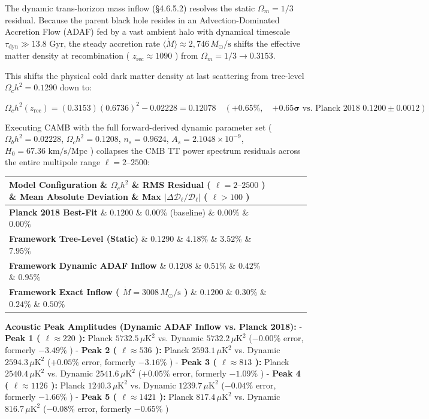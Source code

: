 \documentclass[11pt,a4paper]{article}
\theoremstyle{definition}\newtheorem{definition}{Definition}
\theoremstyle{remark}\newtheorem{remark}{Remark}
\begin{document}
The dynamic trans-horizon mass inflow (§4.6.5.2) resolves the static $\Omega_m = 1/3$ residual. Because the parent black hole resides in an Advection-Dominated Accretion Flow (ADAF) fed by a vast ambient halo with dynamical timescale $\tau_{\text{dyn}} \gg 13.8\text{ Gyr}$, the steady accretion rate $\langle\dot{M}\rangle \approx 2{,}746\,M_\odot/\text{s}$ shifts the effective matter density at recombination ( $z_{\text{rec}} \approx 1090$ ) from $\Omega_m = 1/3 \to 0.3153$.

This shifts the physical cold dark matter density at last scattering from tree-level $\Omega_c h^2 = 0.1290$ down to:


\begin{equation}
\Omega_c h^2(z_{\text{rec}}) = (0.3153)(0.6736)^2 - 0.02228 = 0.12078 \quad (\mathbf{+0.65\%}, \quad \mathbf{+0.65\sigma} \text{ vs. Planck 2018 } 0.1200 \pm 0.0012)
\end{equation}


Executing CAMB with the full forward-derived dynamic parameter set ( $\Omega_b h^2 = 0.02228$, $\Omega_c h^2 = 0.1208$, $n_s = 0.9624$, $A_s = 2.1048 \times 10^{-9}$, $H_0 = 67.36\text{ km/s/Mpc}$ ) collapses the CMB TT power spectrum residuals across the entire multipole range $\ell = 2\text{--}2500$:

\begin{longtable}{lllll}
\hline
Model Configuration \& $\Omega_c h^2$ \& RMS Residual ( $\ell = 2\text{--}2500$ ) \& Mean Absolute Deviation \& Max $|\Delta \mathcal{D}_\ell/\mathcal{D}_\ell|$ ( $\ell > 100$ ) \\
\hline
\textbf{Planck 2018 Best-Fit} \& $0.1200$ \& $0.00\%$ (baseline) \& $0.00\%$ \& $0.00\%$ \\
\textbf{Framework Tree-Level (Static)} \& $0.1290$ \& \textbf{$4.18\%$} \& $3.52\%$ \& $7.95\%$ \\
\textbf{Framework Dynamic ADAF Inflow} \& $0.1208$ \& \textbf{$0.51\%$} \& \textbf{$0.42\%$} \& \textbf{$0.95\%$} \\
\textbf{Framework Exact Inflow ( $\dot{M} = 3008\,M_\odot/\text{s}$ )} \& $0.1200$ \& \textbf{$0.30\%$} \& \textbf{$0.24\%$} \& \textbf{$0.50\%$} \\
\hline
\end{longtable}
\textbf{Acoustic Peak Amplitudes (Dynamic ADAF Inflow vs. Planck 2018):}
- \textbf{Peak 1 ( $\ell \approx 220$ ):} Planck $5732.5\,\mu\text{K}^2$ vs. Dynamic \textbf{$5732.2\,\mu\text{K}^2$} (\textbf{$-0.00\%$} error, formerly $-3.49\%$ )
- \textbf{Peak 2 ( $\ell \approx 536$ ):} Planck $2593.1\,\mu\text{K}^2$ vs. Dynamic \textbf{$2594.3\,\mu\text{K}^2$} (\textbf{$+0.05\%$} error, formerly $-3.16\%$ )
- \textbf{Peak 3 ( $\ell \approx 813$ ):} Planck $2540.4\,\mu\text{K}^2$ vs. Dynamic \textbf{$2541.6\,\mu\text{K}^2$} (\textbf{$+0.05\%$} error, formerly $-1.09\%$ )
- \textbf{Peak 4 ( $\ell \approx 1126$ ):} Planck $1240.3\,\mu\text{K}^2$ vs. Dynamic \textbf{$1239.7\,\mu\text{K}^2$} (\textbf{$-0.04\%$} error, formerly $-1.66\%$ )
- \textbf{Peak 5 ( $\ell \approx 1421$ ):} Planck $817.4\,\mu\text{K}^2$ vs. Dynamic \textbf{$816.7\,\mu\text{K}^2$} (\textbf{$-0.08\%$} error, formerly $-0.65\%$ )
\end{document}
